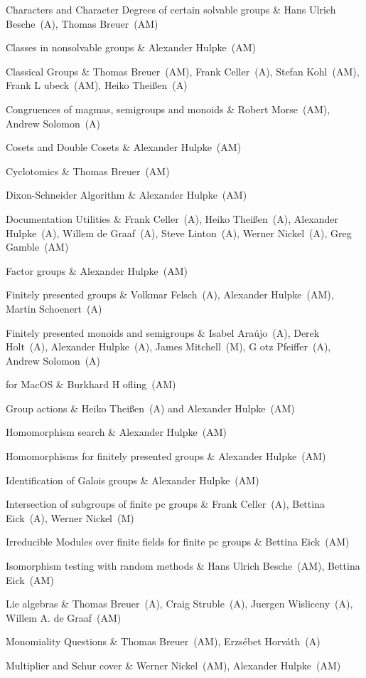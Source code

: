 Characters and Character Degrees of certain solvable groups &
Hans Ulrich Besche~(A), Thomas Breuer~(AM)

Classes in nonsolvable groups &
Alexander Hulpke~(AM)

Classical Groups &
Thomas Breuer~(AM), Frank Celler~(A), Stefan Kohl~(AM), 
Frank L{ u}beck~(AM), Heiko Thei{\ss}en~(A)

Congruences of magmas, semigroups and monoids &
Robert Morse~(AM), Andrew Solomon~(A)

Cosets and Double Cosets &
Alexander Hulpke~(AM)

Cyclotomics &
Thomas Breuer~(AM)

Dixon-Schneider Algorithm &
Alexander Hulpke~(AM)

Documentation Utilities &
Frank Celler~(A), Heiko Thei{\ss}en~(A), Alexander Hulpke~(A), 
Willem de Graaf~(A), Steve Linton~(A), Werner Nickel~(A), Greg Gamble~(AM)

Factor groups &
Alexander Hulpke~(AM)

Finitely presented groups &
Volkmar Felsch~(A), Alexander Hulpke~(AM), Martin Schoenert~(A)

Finitely presented monoids and semigroups &
Isabel Ara{\'u}jo~(A), Derek Holt~(A), Alexander Hulpke~(A), James
Mitchell~(M), G{ o}tz Pfeiffer~(A), Andrew Solomon~(A)

{\GAP} for MacOS & 
Burkhard H{ o}fling~(AM)

Group actions &
Heiko Thei{\ss}en~(A) and Alexander Hulpke~(AM)

Homomorphism search &
Alexander Hulpke~(AM)

Homomorphisms for finitely presented groups &
Alexander Hulpke~(AM)

Identification of Galois groups &
Alexander Hulpke~(AM)

Intersection of subgroups of finite pc groups &
Frank Celler~(A), Bettina Eick~(A), Werner Nickel~(M)

Irreducible Modules over finite fields for finite pc groups &
Bettina Eick~(AM)

Isomorphism testing with random methods &
Hans Ulrich Besche~(AM), Bettina Eick~(AM)

Lie algebras &
Thomas Breuer~(A), Craig Struble~(A), Juergen Wisliceny~(A), Willem A. de Graaf~(AM)

Monomiality Questions &
Thomas Breuer~(AM), Erzs{\'e}bet Horv{\'a}th~(A)

Multiplier and Schur cover &
Werner Nickel~(AM), Alexander Hulpke~(AM)

